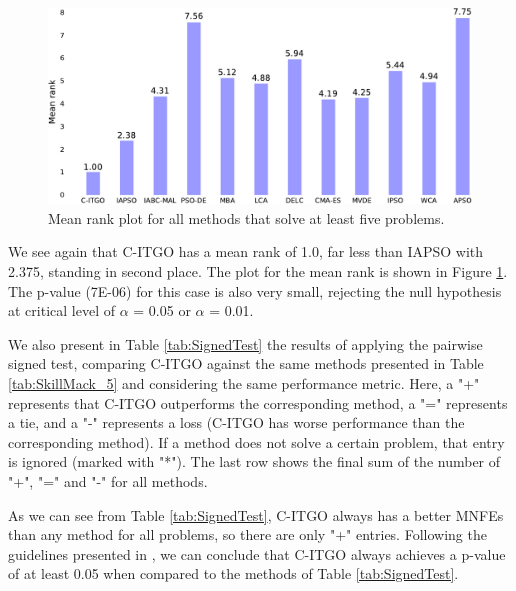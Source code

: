 

\begin{figure}[bp]
    \begin{center}
    \includegraphics[scale=0.6]{Imgs/SkillMack_5-crop.pdf}
    \end{center}
    \captionsetup{justification=centering}
    \vspace*{-4mm}
    \caption{Mean rank plot for all methods that solve at least five problems.}\label{fig:SkillMack_5}
\end{figure}

We see again that C-ITGO has a mean rank of 1.0, far less than IAPSO with 2.375, standing in second place. The plot for the mean rank is shown in Figure \ref{fig:SkillMack_5}. The p-value (7E-06) for this case is also very small, rejecting the null hypothesis at critical level of $\alpha$ = 0.05 or $\alpha$ = 0.01.


We also present in Table \ref{tab:SignedTest} the results of applying the pairwise signed test, comparing C-ITGO against the same methods presented in Table \ref{tab:SkillMack_5} and considering the same performance metric. Here, a "+" represents that C-ITGO outperforms the corresponding method, a "=" represents a tie, and a "-" represents a loss (C-ITGO has worse performance than the corresponding method). If a method does not solve a certain problem, that entry is ignored (marked with "*"). The last row shows the final sum of the number of "+", "=" and "-" for all methods.



As we can see from Table \ref{tab:SignedTest}, C-ITGO always has a better MNFEs than any method for all problems, so there are only "+" entries. Following the guidelines presented in \cite{Friedman}, we can conclude that C-ITGO always achieves a p-value of at least 0.05 when compared to the methods of Table \ref{tab:SignedTest}.


